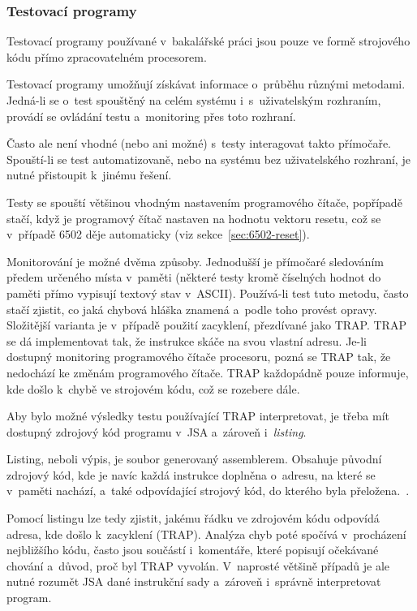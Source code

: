 \subsubsection{Testovací programy}
\label{sec:testovaci-programy}
Testovací programy používané v~bakalářské práci jsou pouze ve formě strojového kódu přímo zpracovatelném procesorem.

Testovací programy umožňují získávat informace o~průběhu různými metodami. Jedná-li se o~test spouštěný na celém systému i~s~uživatelským rozhraním, provádí se ovládání testu a~monitoring přes toto rozhraní.

Často ale není vhodné (nebo ani možné) s~testy interagovat takto přímočaře. Spouští-li se test automatizovaně, nebo na systému bez uživatelského rozhraní, je nutné přistoupit k~jinému řešení.

Testy se spouští většinou vhodným nastavením programového čítače, popřípadě stačí, když je programový čítač nastaven na hodnotu vektoru resetu, což se v~případě 6502 děje automaticky (viz sekce~\ref{sec:6502-reset}).

Monitorování je možné dvěma způsoby. Jednodušší je přímočaré sledováním předem určeného místa v~paměti (některé testy kromě číselných hodnot do paměti přímo vypisují textový stav v~ASCII). Používá-li test tuto metodu, často stačí zjistit, co jaká chybová hláška znamená a~podle toho provést opravy. Složitější varianta je v~případě použití zacyklení, přezdívané jako TRAP. TRAP se dá implementovat tak, že instrukce skáče na svou vlastní adresu. Je-li dostupný monitoring programového čítače procesoru, pozná se TRAP tak, že nedochází ke změnám programového čítače. TRAP každopádně pouze informuje, kde došlo k~chybě ve strojovém kódu, což se rozebere dále.

Aby bylo možné výsledky testu používající TRAP interpretovat, je třeba mít dostupný zdrojový kód programu v~JSA a~zároveň i~\emph{listing}.

\begin{definition}[Listing]
	Listing, neboli výpis, je soubor generovaný assemblerem. Obsahuje původní zdrojový kód, kde je navíc každá instrukce doplněna o~adresu, na které se v~paměti nachází, a~také odpovídající strojový kód, do kterého byla přeložena.~\cite{Plantz2021:computer-organization}.
\end{definition}

Pomocí listingu lze tedy zjistit, jakému řádku ve zdrojovém kódu odpovídá adresa, kde došlo k~zacyklení (TRAP). Analýza chyb poté spočívá v~procházení nejbližšího kódu, často jsou součástí i~komentáře, které popisují očekávané chování a~důvod, proč byl TRAP vyvolán. V~naprosté většině případů je ale nutné rozumět JSA dané instrukční sady a~zároveň i~správně interpretovat program.

